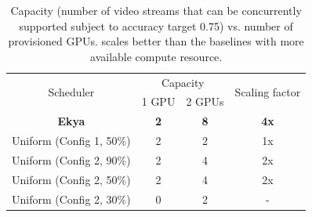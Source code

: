 \begin{table}
\centering
\begin{tabular}{cccc}
\hline
\multirow{2}{*}{Scheduler} & \multicolumn{2}{c}{Capacity} & \multirow{2}{*}{Scaling factor} \\ \cline{2-3}
& 1 GPU & 2 GPUs &  \\ \hline
\textbf{Ekya} & \textbf{2} & \textbf{8} & \textbf{4x} \\ \hline
Uniform (Config 1, 50\%) & 2 & 2 & 1x \\ \hline
Uniform (Config 2, 90\%) & 2 & 4 & 2x \\ \hline
Uniform (Config 2, 50\%) & 2 & 4 & 2x \\ \hline
Uniform (Config 2, 30\%) & 0 & 2 & - \\ \hline
\end{tabular}
\caption{ Capacity (number of video streams that can be concurrently supported subject to accuracy target 0.75) vs. number of provisioned GPUs.
\name scales better than the \fair baselines with more available compute resource.
}
\label{tab:scalability-gpu-vs-cam-thresholded}
\end{table}





